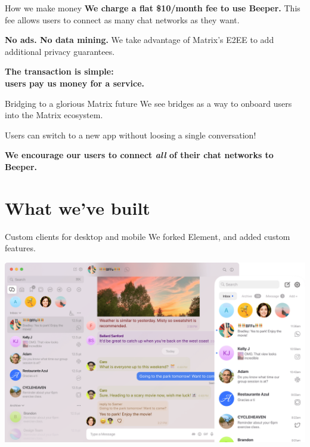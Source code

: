 \documentclass{beeper}
\begin{document}
\begin{frame}{How we make money}
    \textbf{We charge a flat \$10/month fee to use Beeper.} This fee allows
    users to connect as many chat networks as they want.
    \pause

    \textbf{No ads. No data mining.} We take advantage of Matrix's E2EE to add
    additional privacy guarantees.
    \pause

    \begin{center}
        \LARGE
        \textbf{The transaction is simple:\\ users pay us money for a service.}
    \end{center}
\end{frame}

\begin{frame}{Bridging to a glorious Matrix future}
    We see bridges as a way to onboard users into the Matrix ecosystem.

    Users can switch to a new app without loosing a single conversation!
    \pause

    \vspace{1cm}
    \begin{center}
        \Large
        \textbf{We encourage our users to connect \textit{all} of their chat
        networks to Beeper.}
    \end{center}
\end{frame}

\section{What we've built}

\begin{frame}{Custom clients for desktop and mobile}
    We forked Element, and added custom features.
    \vspace{0.5cm}

    \centerline{\includegraphics[width=\textwidth]{images/desktop-and-mobile}}
\end{frame}
\end{document}
